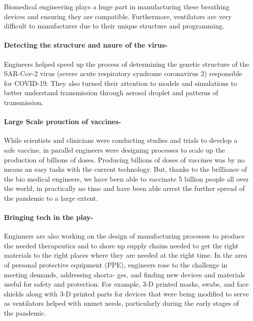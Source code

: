\documentclass[a4paper,12pt]{extarticle}
\begin{document}
Biomedical engineering plays a huge part in manufacturing these breathing devices and ensuring they are compatible. Furthermore, ventilators are very difficult to manufacturer due to their unique structure and programming.\\

\paragraph{Detecting the structure and naure of the virus-}Engineers helped speed up the process of determining the genetic structure of the SAR-Cov-2 virus (severe acute respiratory syndrome coronavirus 2) responsible for COVID-19. They also turned their attention to models and simulations to better understand transmission through aerosol droplet and patterns of transmission.\\

\paragraph{Large Scale prouction of vaccines-}While scientists and clinicians were conducting studies and trials to develop a safe vaccine, in parallel engineers were designing processes to scale up the production of billions of doses. Producing billions of doses of vaccines was by no means an easy tasks with the current technology. But, thanks to the brilliance of the bio medical engineers, we have been able to vaccinate 5 billion people all over the world, in practically no time and have been able arrest the further spread of the pandemic to a large extent.\\

\paragraph{Bringing tech in the play-}Enginners are also working on the design of manufacturing processes to produce the needed therapeutics and to shore up supply chains needed to get the right materials to the right places where they are needed at the right time. In the area of personal protective equipment (PPE), engineers rose to the challenge in meeting demands, addressing shorta- ges, and finding new devices and materials useful for safety and protection. For example, 3-D printed masks, swabs, and face shields along with 3-D printed parts for devices that were being modified to serve as ventilators helped with unmet needs, particularly during the early stages of the pandemic.
\end{document}
